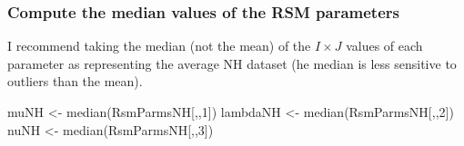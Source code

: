 \documentclass[
]{book}
\newenvironment{Shaded}{\begin{snugshade}}{\end{snugshade}}
\newcommand{\AttributeTok}[1]{\textcolor[rgb]{0.77,0.63,0.00}{#1}}
\newcommand{\CommentTok}[1]{\textcolor[rgb]{0.56,0.35,0.01}{\textit{#1}}}
\newcommand{\ControlFlowTok}[1]{\textcolor[rgb]{0.13,0.29,0.53}{\textbf{#1}}}
\newcommand{\DecValTok}[1]{\textcolor[rgb]{0.00,0.00,0.81}{#1}}
\newcommand{\FunctionTok}[1]{\textcolor[rgb]{0.00,0.00,0.00}{#1}}
\newcommand{\NormalTok}[1]{#1}
\newcommand{\OtherTok}[1]{\textcolor[rgb]{0.56,0.35,0.01}{#1}}
\newcommand{\SpecialCharTok}[1]{\textcolor[rgb]{0.00,0.00,0.00}{#1}}
\begin{document}
\begin{Shaded}
\end{Shaded}

\hypertarget{compute-the-median-values-of-the-rsm-parameters}{%
\subsubsection{Compute the median values of the RSM parameters}\label{compute-the-median-values-of-the-rsm-parameters}}

I recommend taking the median (not the mean) of the \(I \times J\) values of each parameter as representing the average NH dataset (he median is less sensitive to outliers than the mean).

\begin{Shaded}
\begin{Highlighting}[]
\NormalTok{muNH }\OtherTok{\textless{}{-}} \FunctionTok{median}\NormalTok{(RsmParmsNH[,,}\DecValTok{1}\NormalTok{]) }
\NormalTok{lambdaNH }\OtherTok{\textless{}{-}} \FunctionTok{median}\NormalTok{(RsmParmsNH[,,}\DecValTok{2}\NormalTok{])}
\NormalTok{nuNH }\OtherTok{\textless{}{-}} \FunctionTok{median}\NormalTok{(RsmParmsNH[,,}\DecValTok{3}\NormalTok{])}
\end{Highlighting}
\end{Shaded}
\end{document}
